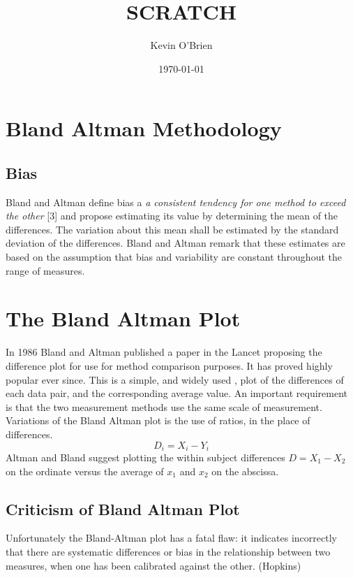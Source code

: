 \documentclass[12pt, a4paper]{report}
\begin{document}
\author{Kevin O'Brien}
\title{SCRATCH}
\date{\today}
\maketitle

\tableofcontents \setcounter{tocdepth}{2}


\section{Bland Altman Methodology}

\subsection{Bias}
Bland and Altman define bias a \emph{a consistent tendency for one
method to exceed the other} [$3$] and propose estimating its value
by determining the mean of the differences. The variation about
this mean shall be estimated by the  standard deviation of the
differences. Bland and Altman remark that these estimates are based on the
assumption that bias and variability are constant throughout the
range of measures.

\section{The Bland Altman Plot}
In 1986 Bland and Altman published a paper in the Lancet proposing
the difference plot for use for method comparison purposes. It has
proved highly popular ever since. This is a simple, and widely
used , plot of the differences of each data pair, and the
corresponding average value. An important requirement is that the
two measurement methods use the same scale of measurement.
\\
Variations of the Bland Altman plot is the use of ratios, in the
place of differences.
\begin{equation}
D_{i} = X_{i} - Y_{i}   \label{BA01}
\end{equation}
Altman and Bland suggest plotting the within subject differences $
D = X_{1} - X_{2} $ on the ordinate versus the average of $x_{1}$
and  $x_{2}$ on the abscissa.



\subsection{Criticism of Bland Altman Plot}
Unfortunately the Bland-Altman plot has a fatal flaw: it indicates
incorrectly that there are systematic differences or bias in the
relationship between two measures, when one has been calibrated
against the other. (Hopkins)
\end{document}
